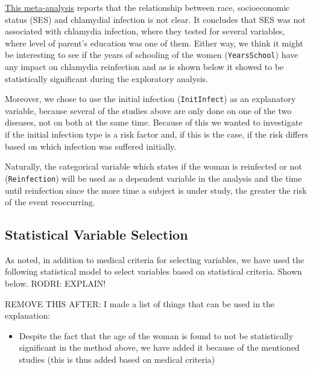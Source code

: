 \documentclass[
]{article}
\providecommand{\tightlist}{%
  \setlength{\itemsep}{0pt}\setlength{\parskip}{0pt}}
\begin{document}
\href{https://www.ncbi.nlm.nih.gov/pmc/articles/PMC2094865/}{This meta-analysis} reports that the relationship between race, socioeconomic status (SES) and chlamydial infection is not clear. It concludes that SES was not associated with chlamydia infection, where they tested for several variables, where level of parent's education was one of them. Either way, we think it might be interesting to see if the years of schooling of the women (\texttt{YearsSchool}) have any impact on chlamydia reinfection and as is shown below it showed to be statistically significant during the exploratory analysis.

Moreover, we chose to use the initial infection (\texttt{InitInfect}) as an explanatory variable, because several of the studies above are only done on one of the two diseases, not on both at the same time. Because of this we wanted to investigate if the initial infection type is a risk factor and, if this is the case, if the risk differs based on which infection was suffered initially.

Naturally, the categorical variable which states if the woman is reinfected or not (\texttt{Reinfection}) will be used as a dependent variable in the analysis and the time until reinfection since the more time a subject is under study, the greater the risk of the event reoccurring.

\hypertarget{statistical-variable-selection}{%
\subsection{Statistical Variable Selection}\label{statistical-variable-selection}}

As noted, in addition to medical criteria for selecting variables, we have used the following statistical model to select variables based on statistical criteria. Shown below. RODRI: EXPLAIN!

REMOVE THIS AFTER: I made a list of things that can be used in the explanation:

\begin{itemize}
\tightlist
\item
  Despite the fact that the age of the woman is found to not be statistically significant in the method above, we have added it because of the mentioned studies (this is thus added based on medical criteria)
\end{itemize}
\end{document}
